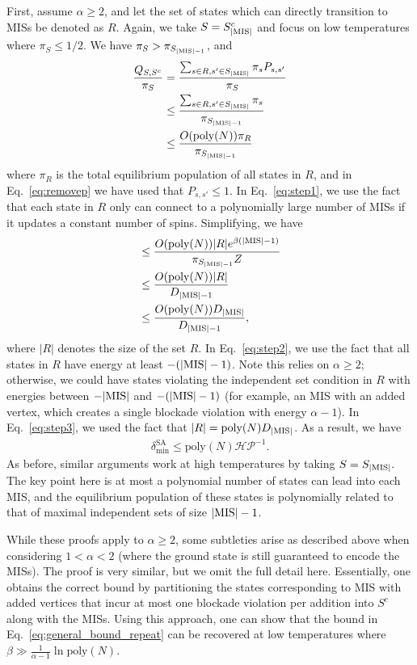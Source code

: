 \documentclass[twocolumn,amssymb,secnumarabic, prl, aps, nofootinbib]{revtex4-1}
\newcommand{\MIS}{\textnormal{MIS}}
\newcommand{\DMIS}{D_{|\textnormal{MIS}|}}
\newcommand{\DMISminusone}{D_{|\textnormal{MIS}|-1}}
\begin{document}
First, assume $\alpha\geq 2$, and let the set of states which can directly transition to MISs be denoted as $R.$ Again, we take $S=S_{|\MIS|}^c$ and focus on low temperatures where $\pi_S\leq 1/2.$ We have $\pi_S > \pi_{S_{|\MIS|-1}}$, and 
\begin{align}
	\frac{Q_{S, S^c}}{\pi_S} &= \frac{\sum_{s\in R, s'\in S_{|\MIS|}}\pi_s P_{s, s'}}{\pi_S}\nonumber\\
	&\leq \frac{\sum_{s\in R, s'\in S_{|\MIS|}}\pi_s}{\pi_{S_{|\MIS|-1}}}\label{eq:removep}\\
	&\leq \frac{O(\text{poly}(N))\pi_R}{\pi_{S_{|\MIS|-1}}}\label{eq:step1}
\end{align}%
where $\pi_R$ is the total equilibrium population of all states in $R$, and in Eq.~\eqref{eq:removep} we have used that $P_{s, s'}\leq 1.$
In Eq.~\eqref{eq:step1}, we use the fact that each state in $R$ only can connect to a polynomially large number of MISs if it updates a constant number of spins. Simplifying, we have
\begin{align}
	&\leq \frac{O(\text{poly}(N))|R|e^{\beta(|\MIS|-1)}}{\pi_{S_{|\MIS|-1}}Z}\label{eq:step2}\\
	&\leq \frac{O(\text{poly}(N))|R|}{\DMISminusone}\\
	&\leq \frac{O(\text{poly}(N))\DMIS}{\DMISminusone}\label{eq:step3},
\end{align}
where $|R|$ denotes the size of the set $R$.
In Eq.~\eqref{eq:step2}, we use the fact that all states in $R$ have energy at least $-(|\MIS|-1)$. Note this relies on $\alpha\geq 2$; otherwise, we could have states violating the independent set condition in $R$ with energies between $-|\MIS|$ and $-(|\MIS|-1)$ (for example,  an MIS with an added vertex, which creates a single blockade violation with energy $\alpha-1$). In Eq.~\eqref{eq:step3}, we used the fact that $|R| = \text{poly}(N)\DMIS$. As a result, we have 
\begin{align}
	\delta_{\min}^{\text{SA}}\leq \text{poly}(N)\mathcal{HP}^{-1}.\label{eq:general_bound_repeat}
\end{align}
As before, similar arguments work at high temperatures by taking $S=S_{|\MIS|}.$ The key point here is at most a polynomial number of states can lead into each MIS, and the equilibrium population of these states is polynomially related to that of maximal independent sets of size $|\MIS| -1$.

While these proofs apply to $\alpha \geq 2$, some subtleties arise as described above when considering $1<\alpha < 2$ (where the ground state is still guaranteed to encode the MISs). The proof is very similar, but we omit the full detail here. Essentially, one obtains the correct bound by partitioning the states corresponding to MIS with added vertices that incur at most one blockade violation per addition into $S^c$ along with the MISs. Using this approach, one can show that the bound in Eq.~\eqref{eq:general_bound_repeat} can be recovered at low temperatures where $\beta \gg\frac{1}{\alpha-1}\ln\text{poly}(N)$.   \\
\end{document}
